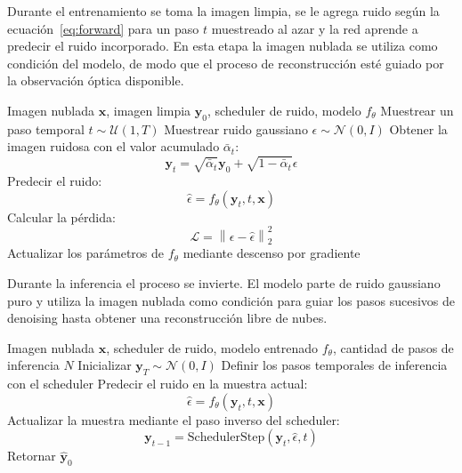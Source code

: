 Durante el entrenamiento se toma la imagen limpia, se le agrega ruido según la ecuación~\eqref{eq:forward} para un paso $t$ muestreado al azar y la red aprende a predecir el ruido incorporado. En esta etapa la imagen nublada se utiliza como condición del modelo, de modo que el proceso de reconstrucción esté guiado por la observación óptica disponible.


\begin{algorithm}[H]
\caption{Entrenamiento de DDPM condicional} \label{alg:ddpm_train}
\begin{algorithmic}[1]
\Require Imagen nublada $\mathbf{x}$, imagen limpia $\mathbf{y}_0$, scheduler de ruido, modelo $f_\theta$
\State Muestrear un paso temporal $t \sim \mathcal{U}(1,T)$
\State Muestrear ruido gaussiano $\epsilon \sim \mathcal{N}(0,I)$
\State Obtener la imagen ruidosa con el valor acumulado $\bar{\alpha}_t$: \[ \mathbf{y}_t = \sqrt{\bar{\alpha}_t}\mathbf{y}_0 + \sqrt{1-\bar{\alpha}_t}\epsilon \]
\State Predecir el ruido: \[ \hat{\epsilon} = f_\theta(\mathbf{y}_t, t, \mathbf{x}) \]
\State Calcular la pérdida: \[ \mathcal{L} = \left\| \epsilon - \hat{\epsilon} \right\|_2^2 \]
\State Actualizar los parámetros de $f_\theta$ mediante descenso por gradiente
\end{algorithmic}
\end{algorithm} 

Durante la inferencia el proceso se invierte. El modelo parte de ruido gaussiano puro y utiliza la imagen nublada como condición para guiar los pasos sucesivos de denoising hasta obtener una reconstrucción libre de nubes.


\begin{algorithm}[H]
\caption{Inferencia de DDPM condicional} \label{alg:ddpm_inference}
\begin{algorithmic}[1]
\Require Imagen nublada $\mathbf{x}$, scheduler de ruido, modelo entrenado $f_\theta$, cantidad de pasos de inferencia $N$
\State Inicializar $\mathbf{y}_T \sim \mathcal{N}(0,I)$
\State Definir los pasos temporales de inferencia con el scheduler
\State Predecir el ruido en la muestra actual: \[ \hat{\epsilon} = f_\theta(\mathbf{y}_t, t, \mathbf{x}) \]
\State Actualizar la muestra mediante el paso inverso del scheduler: \[ \mathbf{y}_{t-1} = \text{SchedulerStep}(\mathbf{y}_t, \hat{\epsilon}, t) \]
\EndFor \State Retornar $\hat{\mathbf{y}}_0$
\end{algorithmic}
\end{algorithm}


